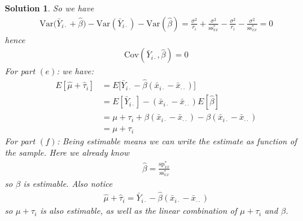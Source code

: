 \documentclass[11pt]{article}
\newtheorem{sol}{Solution}
\begin{document}
\begin{sol}
So we have
\begin{align*}
	\text{Var}\Big(\bar{Y}_{i\cdot}  + \hat{\beta}\Big)- \text{Var}(\bar{Y}_{i\cdot}) - \text{Var}(\hat{\beta}) = \frac{\sigma^2}{r_i} + \frac{\sigma^2}{\text{ss}^{\ast}_{xx}} - \frac{\sigma^2}{r_i} - \frac{\sigma^2}{\text{ss}^{\ast}_{xx}} = 0
\end{align*}
hence
\begin{align*}
	\text{Cov}(\bar{Y}_{i\cdot}, \hat{\beta}) = 0
\end{align*}
\vskip 2mm
For part $(e)$:\vskip 2mm
we have:
\begin{align*}
	E[\hat{\mu} + \hat{\tau}_i] &= E\Big[\bar{Y}_{i\cdot} - \hat{\beta}(\bar{x}_{i\cdot} - \bar{x}_{\cdot\cdot})\Big]\\
	&= E[\bar{Y}_{i\cdot}] - (\bar{x}_{i\cdot} - \bar{x}_{\cdot\cdot})E[\hat{\beta}]\\
	&= \mu + \tau_i + \beta(\bar{x}_{i\cdot} - \bar{x}_{\cdot\cdot}) - \beta(\bar{x}_{i\cdot} - \bar{x}_{\cdot\cdot})\\
	&= \mu + \tau_i
\end{align*}
\vskip 2mm
For part $(f)$:\vskip 2mm
Being estimable means we can write the estimate as function of the sample. Here we already know
\begin{align*}
	\hat{\beta} = \frac{\text{sp}^{\ast}_{xx}}{\text{ss}^{\ast}_{xx}}
\end{align*}
so $\beta$ is estimable. Also notice
\begin{align*}
	\hat{\mu} + \hat{\tau}_i = \bar{Y}_{i\cdot} - \hat{\beta}(\bar{x}_{i\cdot} - \bar{x}_{\cdot\cdot})
\end{align*}
so $\mu + \tau_i$ is also estimable, as well as the linear combination of $\mu + \tau_i$ and $\beta$.
\end{sol}
\end{document}
